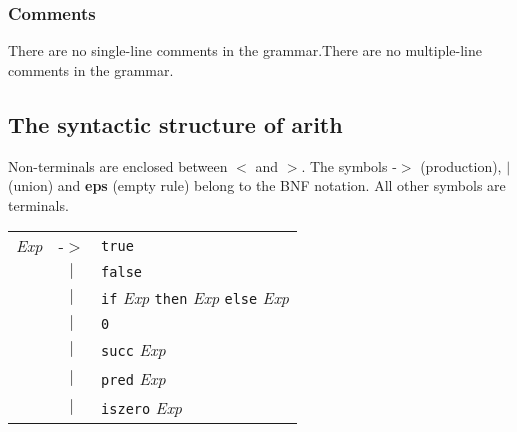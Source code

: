 \documentclass{article}
\begin{document}
\subsubsection*{Comments}

There are no single-line comments in the grammar.There are no multiple-line comments in the grammar.

\subsection*{The syntactic structure of arith}

Non-terminals are enclosed between $<$ and $>$.
The symbols -$>$ (production),  \textbf{$|$}  (union)
and \textbf{eps} (empty rule) belong to the BNF notation.
All other symbols are terminals.

\begin{center}\begin{tabular}{lll}
\textit{Exp} & -$>$ & \texttt{true} \\
 & \multicolumn{1}{c}{\textbf{$|$}} & \texttt{false} \\
 & \multicolumn{1}{c}{\textbf{$|$}} & \texttt{if} \textit{Exp} \texttt{then} \textit{Exp} \texttt{else} \textit{Exp} \\
 & \multicolumn{1}{c}{\textbf{$|$}} & \texttt{0} \\
 & \multicolumn{1}{c}{\textbf{$|$}} & \texttt{succ} \textit{Exp} \\
 & \multicolumn{1}{c}{\textbf{$|$}} & \texttt{pred} \textit{Exp} \\
 & \multicolumn{1}{c}{\textbf{$|$}} & \texttt{iszero} \textit{Exp} \\
\end{tabular}\end{center}

\end{document}
